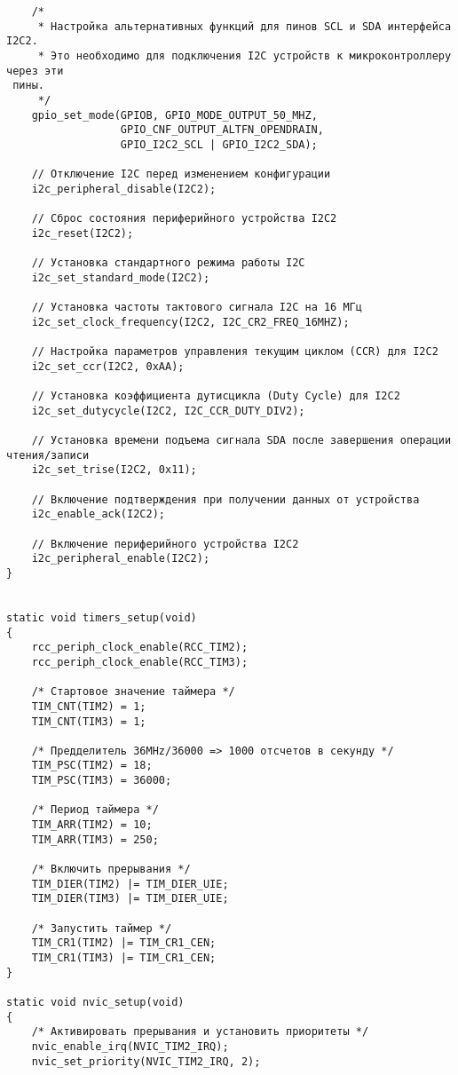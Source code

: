 \begin{code}
\begin{verbatim}
    /*
     * Настройка альтернативных функций для пинов SCL и SDA интерфейса I2C2.
     * Это необходимо для подключения I2C устройств к микроконтроллеру через эти
 пины.
     */
    gpio_set_mode(GPIOB, GPIO_MODE_OUTPUT_50_MHZ,
                  GPIO_CNF_OUTPUT_ALTFN_OPENDRAIN,
                  GPIO_I2C2_SCL | GPIO_I2C2_SDA);
    
    // Отключение I2C перед изменением конфигурации
    i2c_peripheral_disable(I2C2);
    
    // Сброс состояния периферийного устройства I2C2
    i2c_reset(I2C2);
    
    // Установка стандартного режима работы I2C 
    i2c_set_standard_mode(I2C2);
    
    // Установка частоты тактового сигнала I2C на 16 МГц
    i2c_set_clock_frequency(I2C2, I2C_CR2_FREQ_16MHZ);
    
    // Настройка параметров управления текущим циклом (CCR) для I2C2
    i2c_set_ccr(I2C2, 0xAA);
    
    // Установка коэффициента дутисцикла (Duty Cycle) для I2C2
    i2c_set_dutycycle(I2C2, I2C_CCR_DUTY_DIV2);
    
    // Установка времени подъема сигнала SDA после завершения операции чтения/записи
    i2c_set_trise(I2C2, 0x11);
    
    // Включение подтверждения при получении данных от устройства
    i2c_enable_ack(I2C2);
    
    // Включение периферийного устройства I2C2
    i2c_peripheral_enable(I2C2);
}


static void timers_setup(void)
{
    rcc_periph_clock_enable(RCC_TIM2);
    rcc_periph_clock_enable(RCC_TIM3);

    /* Стартовое значение таймера */
    TIM_CNT(TIM2) = 1;
    TIM_CNT(TIM3) = 1;

    /* Предделитель 36MHz/36000 => 1000 отсчетов в секунду */
    TIM_PSC(TIM2) = 18;
    TIM_PSC(TIM3) = 36000;

    /* Период таймера */
    TIM_ARR(TIM2) = 10;
    TIM_ARR(TIM3) = 250;

    /* Включить прерывания */
    TIM_DIER(TIM2) |= TIM_DIER_UIE;
    TIM_DIER(TIM3) |= TIM_DIER_UIE;

    /* Запустить таймер */
    TIM_CR1(TIM2) |= TIM_CR1_CEN;
    TIM_CR1(TIM3) |= TIM_CR1_CEN;
}

static void nvic_setup(void)
{
    /* Активировать прерывания и установить приоритеты */
    nvic_enable_irq(NVIC_TIM2_IRQ);
    nvic_set_priority(NVIC_TIM2_IRQ, 2);


\end{verbatim}
\end{code}
